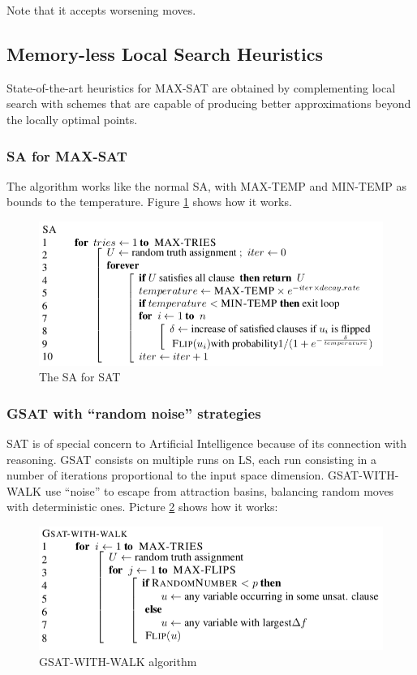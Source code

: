\documentclass[10pt]{article}
\begin{document}
Note that it accepts worsening moves.

\subsection{Memory-less Local Search Heuristics}
State-of-the-art heuristics for MAX-SAT are obtained by complementing local search with schemes that are capable of producing better approximations beyond the locally optimal points.
\subsubsection{SA for MAX-SAT}
The algorithm works like the normal SA, with MAX-TEMP and MIN-TEMP as bounds to the temperature. Figure \ref{fig:sasat} shows how it works.

\begin{figure}[H]
\includegraphics[scale=0.3]{sasat}
\caption{The SA for SAT}
\centering
\label{fig:sasat}
\end{figure}

\subsubsection{GSAT with ``random noise'' strategies}
SAT is of special concern to Artificial Intelligence because of its connection with reasoning. GSAT consists on multiple runs on LS, each run consisting in a number of iterations proportional to the input space dimension. GSAT-WITH-WALK use ``noise'' to escape from attraction basins, balancing random moves with deterministic ones. Picture \ref{fig:gsat} shows how it works:

\begin{figure}[H]
\includegraphics[scale=0.3]{gsat}
\caption{GSAT-WITH-WALK algorithm}
\centering
\label{fig:gsat}
\end{figure}
\end{document}
